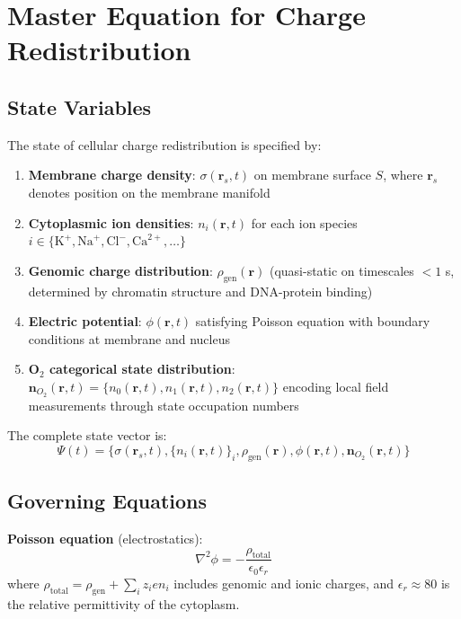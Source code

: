 \documentclass[twocolumn,10pt,aps,prd,superscriptaddress,floatfix,nofootinbib]{revtex4-2}
\theoremstyle{remark}
\begin{document}
\section{Master Equation for Charge Redistribution}
\label{sec:dynamics}

\subsection{State Variables}

The state of cellular charge redistribution is specified by:

\begin{enumerate}
\item \textbf{Membrane charge density}: $\sigma(\mathbf{r}_s, t)$ on membrane surface $S$, where $\mathbf{r}_s$ denotes position on the membrane manifold
\item \textbf{Cytoplasmic ion densities}: $n_i(\mathbf{r}, t)$ for each ion species $i \in \{\mathrm{K}^+, \mathrm{Na}^+, \mathrm{Cl}^-, \mathrm{Ca}^{2+}, \ldots\}$
\item \textbf{Genomic charge distribution}: $\rho_{\mathrm{gen}}(\mathbf{r})$ (quasi-static on timescales $< 1$ s, determined by chromatin structure and DNA-protein binding)
\item \textbf{Electric potential}: $\phi(\mathbf{r}, t)$ satisfying Poisson equation with boundary conditions at membrane and nucleus
\item \textbf{O$_2$ categorical state distribution}: $\mathbf{n}_{O_2}(\mathbf{r}, t) = \{n_0(\mathbf{r}, t), n_1(\mathbf{r}, t), n_2(\mathbf{r}, t)\}$ encoding local field measurements through state occupation numbers
\end{enumerate}

The complete state vector is:
\begin{equation}
\Psi(t) = \{\sigma(\mathbf{r}_s, t), \{n_i(\mathbf{r}, t)\}_i, \rho_{\mathrm{gen}}(\mathbf{r}), \phi(\mathbf{r}, t), \mathbf{n}_{O_2}(\mathbf{r}, t)\}
\label{eq:state_vector}
\end{equation}

\subsection{Governing Equations}

\textbf{Poisson equation} (electrostatics):
\begin{equation}
\nabla^2\phi = -\frac{\rho_{\mathrm{total}}}{\epsilon_0\epsilon_r}
\label{eq:poisson}
\end{equation}
where $\rho_{\mathrm{total}} = \rho_{\mathrm{gen}} + \sum_i z_i e n_i$ includes genomic and ionic charges, and $\epsilon_r \approx 80$ is the relative permittivity of the cytoplasm.
\end{document}
